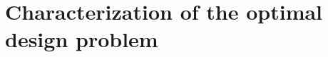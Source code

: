 \documentclass[11pt]{article}
\begin{document}
\section{Characterization of the optimal design problem} \label{sec:relaxed}
\end{document}
